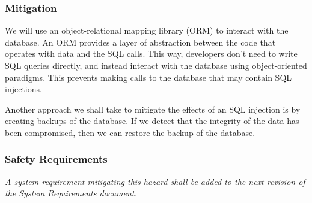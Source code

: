 \documentclass[fullpage]{article}
\begin{document}
\subsubsection*{Mitigation}
We will use an object-relational mapping library (ORM) to interact with the database. An ORM provides a layer of abstraction between the code that operates with data and the SQL calls. This way, developers don’t need to write SQL queries directly, and instead interact with the database using object-oriented paradigms. This prevents making calls to the database that may contain SQL injections.

Another approach we shall take to mitigate the effects of an SQL injection is by creating backups of the database. If we detect that the integrity of the data has been compromised, then we can restore the backup of the database.

\subsubsection*{Safety Requirements}
\emph{A system requirement mitigating this hazard shall be added to the next revision of the System Requirements document.}

\begin{comment}
\begin{thebibliography}{9}

\bibitem{website}
S. Liu, “Canada most popular desktop browsers 2021,” Statista, 04-Oct-2021. [Online]. Available: https://www.statista.com/statistics/499462/most-popular-desktop-browsers-in-canada-by-market-share/. [Accessed: 17-Oct-2021].

\end{thebibliography}
\end{comment}
\end{document}

